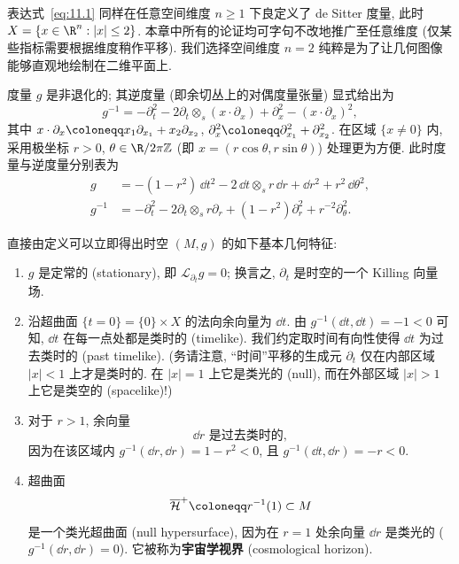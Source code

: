 \begin{remark}[高维推广]\label{rem:11.2}
表达式~\eqref{eq:11.1} 同样在任意空间维度 $n \ge 1$ 下良定义了 de Sitter 度量, 此时 $X = \{x \in \R^n : |x| \le 2\}$. 本章中所有的论证均可字句不改地推广至任意维度 (仅某些指标需要根据维度稍作平移). 我们选择空间维度 $n = 2$ 纯粹是为了让几何图像能够直观地绘制在二维平面上.
\end{remark}

度量 $g$ 是非退化的; 其逆度量 (即余切丛上的对偶度量张量) 显式给出为
\begin{equation}\label{eq:11.2}
    g^{-1} = -\partial_t^2 - 2 \partial_t \otimes_s (x \cdot \partial_x) + \partial_x^2 - (x \cdot \partial_x)^2,
\end{equation}
其中 $x \cdot \partial_x \defeq x_1 \partial_{x_1} + x_2 \partial_{x_2}$, $\partial_x^2 \defeq \partial_{x_1}^2 + \partial_{x_2}^2$. 在区域 $\{x \ne 0\}$ 内, 采用极坐标 $r > 0$, $\theta \in \R/2\pi\mathbb{Z}$ (即 $x = (r\cos\theta, r\sin\theta)$) 处理更为方便. 此时度量与逆度量分别表为
\begin{equation}\label{eq:11.3}
\begin{aligned}
    g &= -(1 - r^2) \,\dd t^2 - 2 \,\dd t \otimes_s r \,\dd r + \dd r^2 + r^2 \,\dd\theta^2, \\
    g^{-1} &= -\partial_t^2 - 2 \partial_t \otimes_s r \partial_r + (1 - r^2)\partial_r^2 + r^{-2}\partial_\theta^2.
\end{aligned}
\end{equation}

直接由定义可以立即得出时空 $(M, g)$ 的如下基本几何特征:
\begin{enumerate}[label=(\arabic*)]
    \item $g$ 是定常的 (stationary), 即 $\mathcal{L}_{\partial_t} g = 0$; 换言之, $\partial_t$ 是时空的一个 Killing 向量场.
    \item 沿超曲面 $\{t = 0\} = \{0\} \times X$ 的法向余向量为 $\dd t$. 由 $g^{-1}(\dd t, \dd t) = -1 < 0$ 可知, $\dd t$ 在每一点处都是类时的 (timelike). 我们约定取时间有向性使得 $\dd t$ 为过去类时的 (past timelike). (务请注意, “时间”平移的生成元 $\partial_t$ 仅在内部区域 $|x| < 1$ 上才是类时的. 在 $|x| = 1$ 上它是类光的 (null), 而在外部区域 $|x| > 1$ 上它是类空的 (spacelike)!)
    \item 对于 $r > 1$, 余向量
    \begin{equation}\label{eq:11.4}
        \dd r \text{ 是过去类时的},
    \end{equation}
    因为在该区域内 $g^{-1}(\dd r, \dd r) = 1 - r^2 < 0$, 且 $g^{-1}(\dd t, \dd r) = -r < 0$.
    \item 超曲面
    \begin{equation}\label{eq:11.5}
        \overline{\mathcal{H}}^+ \defeq r^{-1}(1) \subset M
    \end{equation}
    是一个类光超曲面 (null hypersurface), 因为在 $r = 1$ 处余向量 $\dd r$ 是类光的 ($g^{-1}(\dd r, \dd r) = 0$). 它被称为\textbf{宇宙学视界} (cosmological horizon).
\end{enumerate}

